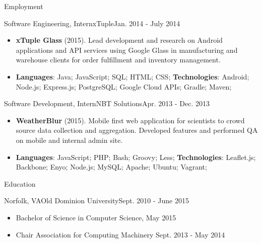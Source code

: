 \documentclass[]{mcdowellcv}
\begin{document}
\begin{cvsection}{Employment}
        \begin{cvsubsection}{Software Engineering, Intern}{xTuple}{Jan. 2014 - July 2014}
            \begin{itemize}
                \item \textbf{xTuple Glass} (2015). Lead development and research on Android applications and API services using Google Glass in manufacturing and warehouse clients for order fulfillment and inventory management.
            \end{itemize}
            \begin{itemize}
                 \item \textbf{Languages}: Java; JavaScript; SQL; HTML; CSS; \newline
                \textbf{Technologies}: Android; Node.js; Express.js; PostgreSQL; Google Cloud APIs; Gradle; Maven;
            \end{itemize}
        \end{cvsubsection}

        \begin{cvsubsection}{Software Development, Intern}{NBT Solutions}{Apr. 2013 - Dec. 2013}
            \begin{itemize}
                \item \textbf{WeatherBlur} (2015). Mobile first web application for scientists to crowd source data  collection and aggregation. Developed features and performed QA on mobile and internal admin site.
            \end{itemize}
            \begin{itemize}
                 \item \textbf{Languages}:  JavaScript; PHP;  Bash; Groovy; Less;\newline
                \textbf{Technologies}: Leaflet.js; Backbone; Enyo; Node.js; MySQL; Apache; Ubuntu; Vagrant;
            \end{itemize}
        \end{cvsubsection}

    \end{cvsection}

    \begin{cvsection}{Education}
        \begin{cvsubsection}{Norfolk, VA}{Old Dominion University}{Sept. 2010 - June 2015}
            \begin{itemize}
                \item  Bachelor of Science in Computer Science, May 2015
                \item Chair Association for Computing Machinery Sept. 2013 - May 2014
            \end{itemize}
        \end{cvsubsection}
    \end{cvsection}
\end{document}
